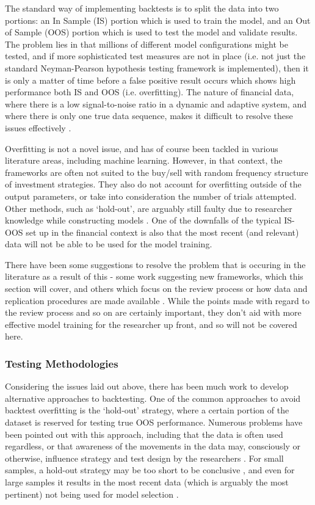 \documentclass[a4paper,11pt,oneside]{article}
\theoremstyle{plain}
\theoremstyle{definition}
\begin{document}
The standard way of implementing backtests is to split the data into two portions: an In Sample (IS) portion which
 is used to train the model, and an Out of Sample (OOS) portion which is used to test the model and validate results. 
 The problem lies in that millions of different model configurations might be tested, and if more sophisticated test 
 measures are not in place (i.e. not just the standard Neyman-Pearson hypothesis testing framework is implemented), 
 then it is only a matter of time before a false positive result occurs which shows high performance both IS and OOS (i.e. overfitting). 
 The nature of financial data, where there is a low signal-to-noise ratio in a dynamic and adaptive system, and 
 where there is only one true data sequence, makes it difficult to resolve these issues effectively 
\cite{BailyPBO, McLean}.
\hfill \break 

Overfitting is not a novel issue, and has of course been tackled in various literature areas, including machine learning. 
However, in that context, the frameworks are often not suited to the buy/sell with random frequency structure of 
investment strategies. They also do not account for overfitting outside of the output parameters, or take into 
consideration the number of trials attempted. Other methods, such as ‘hold-out’, are arguably still faulty due to researcher 
knowledge while constructing models \cite{Schorfheide}. One of the downfalls of the typical IS-OOS set up in the 
financial context is also that the most recent (and relevant) data will not be able to be used for the model training. 
\hfill \break 

There have been some suggestions to resolve the problem that is occuring in the literature as a result of this - some 
work suggesting new frameworks, which this section will cover, and others which focus on the review process or 
how data and replication procedures are made available \cite{Prado}. While the points made with regard to the review process 
and so on are certainly important, they don't aid with more effective model training for the researcher up front, and 
so will not be covered here.

\subsubsection{Testing Methodologies}\label{lr_cscv}

Considering the issues laid out above, there has been much work to develop alternative approaches to backtesting. 
One of the common approaches to avoid backtest overfitting is the ‘hold-out’ strategy, where a certain portion of 
the dataset is reserved for testing true OOS performance. Numerous problems have been pointed out with this 
approach, including that the data is often used regardless, or that awareness of the movements in the data may, 
consciously or otherwise, influence strategy and test design by the researchers \cite{Schorfheide}. For small samples, 
a hold-out strategy may be too short to be conclusive \cite{Weiss}, and even for large samples it results in the 
most recent data (which is arguably the most pertinent) not being used for model selection \cite{Hawkins, BailyPBO}.
\hfill \break 
\end{document}
